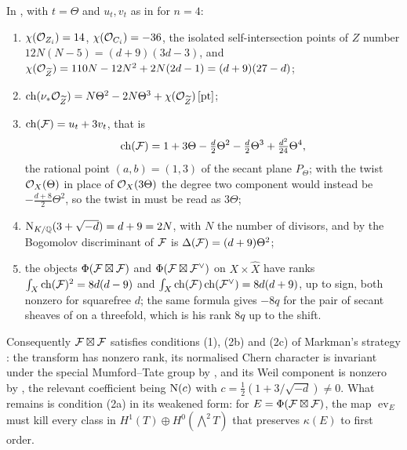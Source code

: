 \begin{proposition}
\label{prop:markman8}
In , with $t=\Theta$ and $u_{t},v_{t}$ as in
\cite[(30)]{paperI} for $n=4$:
\begin{enumerate}[label=\textup{(\roman*)},nosep]
\item $\chi(\mathcal{O}_{Z_{i}})=14$, $\chi(\mathcal{O}_{C_{i}})=-36$, the isolated
  self-intersection points of $Z$ number $12N(N-5)=(d+9)(3d-3)$, and
  $\chi(\mathcal{O}_{\widetilde Z})=110N-12N^{2}+2N(2d-1)=(d+9)(27-d)$;
\item $\operatorname{ch}(\nu_{*}\mathcal{O}_{\widetilde Z})=N\Theta^{2}-2N\Theta^{3}
  +\chi(\mathcal{O}_{\widetilde Z})\,[\mathrm{pt}]$;
\item $\operatorname{ch}(\mathcal{F})=u_{t}+3v_{t}$, that is
  \[
    \operatorname{ch}(\mathcal{F})=1+3\Theta-\tfrac{d}{2}\Theta^{2}-\tfrac{d}{2}\Theta^{3}
      +\tfrac{d^{2}}{24}\Theta^{4},
  \]
  the rational point $(a,b)=(1,3)$ of the secant plane $P_{\Theta}$; with
  the twist $\mathcal{O}_{X}(\Theta)$ in place of $\mathcal{O}_{X}(3\Theta)$ the degree two
  component would instead be $-\tfrac{d+8}{2}\Theta^{2}$, so the twist in
  \cite[Section 12]{Mar25b} must be read as $3\Theta$;
\item $\mathrm{N}_{K/\mathbb{Q}}(3+\sqrt{-d})=d+9=2N$, with $N$ the number of divisors, and by
  \cite[Theorem~14.7]{paperI} the Bogomolov discriminant of $\mathcal{F}$ is
  $\Delta(\mathcal{F})=(d+9)\Theta^{2}$;
\item the objects $\Phi(\mathcal{F}\boxtimes\mathcal{F})$ and $\Phi(\mathcal{F}\boxtimes\mathcal{F}^{\vee})$
  on $X\times\widehat X$ have ranks
  $\int_{X}\operatorname{ch}(\mathcal{F})^{2}=8d(d-9)$ and
  $\int_{X}\operatorname{ch}(\mathcal{F})\operatorname{ch}(\mathcal{F}^{\vee})=8d(d+9)$, up to sign, both nonzero for
  squarefree $d$; the same formula gives $-8q$ for the pair of secant sheaves
  of \cite[Section 11]{Mar25b} on a threefold, which is his rank $8q$ up to
  the shift.
\end{enumerate}
Consequently $\mathcal{F}\boxtimes\mathcal{F}$ satisfies conditions (1), (2b) and (2c) of
Markman's strategy \cite[Section 4]{Mar25b}: the transform has nonzero rank,
its normalised Chern character is invariant under the special Mumford--Tate
group by \cite[Corollary 9.2]{Mar25b}, and its Weil component is nonzero by
\cite[Proposition 10.2]{Mar25b}, the relevant coefficient being
$\mathrm{N}(c)$ with $c=\tfrac12(1+3/\sqrt{-d})\ne0$. What remains is condition
(2a) in its weakened form: for $E=\Phi(\mathcal{F}\boxtimes\mathcal{F})$, the map
$\operatorname{ev}_{E}$ must kill every class in
$H^{1}(T)\oplus H^{0}(\bigwedge^{2}T)$ that preserves $\kappa(E)$ to first
order.
\end{proposition}

